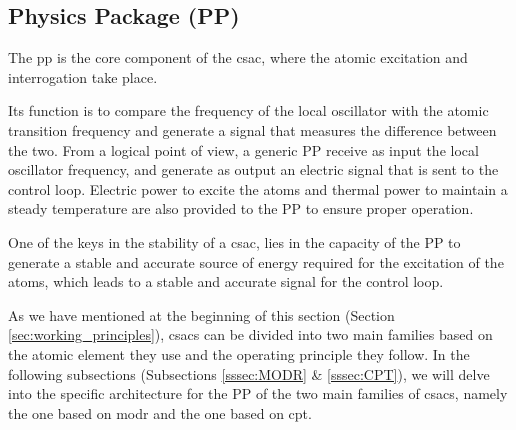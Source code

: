 \subsection{Physics Package (PP)}
\label{subsec:physics_package}

The \acrfull{pp} is the core component of the \acrshort{csac}, where the atomic excitation and interrogation take place.

Its function is to compare the frequency of the local oscillator with the atomic transition frequency and generate a signal that measures the difference between the two.
From a logical point of view, a generic PP receive as input the local oscillator frequency, and generate as output an electric signal that is sent to the control loop.
Electric power to excite the atoms and thermal power to maintain a steady temperature are also provided to the PP to ensure proper operation.

One of the keys in the stability of a \acrshort{csac}, lies in the capacity of the PP to generate a stable and accurate source of energy required for the excitation of the atoms, which leads to a stable and accurate signal for the control loop.

As we have mentioned at the beginning of this section (Section \ref{sec:working_principles}), \acrshort{csacs} can be divided into two main families based on the atomic element they use and the operating principle they follow.
In the following subsections (Subsections \ref{sssec:MODR} \& \ref{sssec:CPT}), we will delve into the specific architecture for the PP of the two main families of \acrshort{csacs}, namely the one based on \acrfull{modr} and the one based on \acrfull{cpt}.



